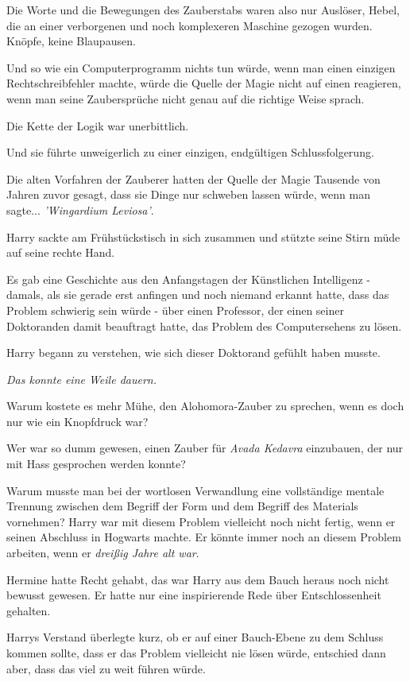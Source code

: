 Die Worte und die Bewegungen des Zauberstabs waren also nur Auslöser, Hebel, die
an einer verborgenen und noch komplexeren Maschine gezogen wurden. Knöpfe, keine
Blaupausen.

Und so wie ein Computerprogramm nichts tun würde, wenn man einen einzigen
Rechtschreibfehler machte, würde die Quelle der Magie nicht auf einen reagieren,
wenn man seine Zaubersprüche nicht genau auf die richtige Weise sprach.

Die Kette der Logik war unerbittlich.

Und sie führte unweigerlich zu einer einzigen, endgültigen Schlussfolgerung.

Die alten Vorfahren der Zauberer hatten der Quelle der Magie Tausende von Jahren
zuvor gesagt, dass sie Dinge nur schweben lassen würde, wenn man sagte...
\emph{'Wingardium Leviosa'}.

Harry sackte am Frühstückstisch in sich zusammen und stützte seine Stirn müde
auf seine rechte Hand.

Es gab eine Geschichte aus den Anfangstagen der Künstlichen Intelligenz -
damals, als sie gerade erst anfingen und noch niemand erkannt hatte, dass das
Problem schwierig sein würde - über einen Professor, der einen seiner
Doktoranden damit beauftragt hatte, das Problem des Computersehens zu lösen.

Harry begann zu verstehen, wie sich dieser Doktorand gefühlt haben musste.

\emph{Das konnte eine Weile dauern.}

Warum kostete es mehr Mühe, den Alohomora-Zauber zu sprechen, wenn es doch nur
wie ein Knopfdruck war?

Wer war so dumm gewesen, einen Zauber für \emph{Avada Kedavra} einzubauen, der
nur mit Hass gesprochen werden konnte?

Warum musste man bei der wortlosen Verwandlung eine vollständige mentale
Trennung zwischen dem Begriff der Form und dem Begriff des Materials vornehmen?
Harry war mit diesem Problem vielleicht noch nicht fertig, wenn er seinen
Abschluss in Hogwarts machte. Er könnte immer noch an diesem Problem arbeiten,
wenn er \emph{dreißig Jahre alt war}.

Hermine hatte Recht gehabt, das war Harry aus dem Bauch heraus noch nicht
bewusst gewesen. Er hatte nur eine inspirierende Rede über Entschlossenheit
gehalten.

Harrys Verstand überlegte kurz, ob er auf einer Bauch-Ebene zu dem Schluss
kommen sollte, dass er das Problem vielleicht nie lösen würde, entschied dann
aber, dass das viel zu weit führen würde.

